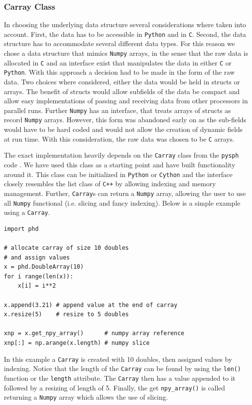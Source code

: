\subsubsection{Carray Class}
In choosing the underlying data structure several considerations where taken into account. First, the
data has to be accessible in \texttt{Python} and in \texttt{C}. Second, the data structure has to
accommodate several different data types. For this reason we chose a data structure that mimics
\texttt{Numpy} arrays, in the sense that the raw data is allocated in \texttt{C} and an interface exist that
manipulates the data in either \texttt{C} or \texttt{Python}. With this approach a decision had to be
made in the form of the raw data. Two choices where considered, either the data would
be held in structs or arrays. The benefit of structs would allow subfields of the data
be compact and allow easy implementations of passing and receiving data from other
processors in parallel runs. Further \texttt{Numpy} has an interface, that treats
arrays of structs as record \texttt{Numpy} arrays. However, this form was abandoned early on
as the sub-fields would have to be hard coded and would not allow the creation of
dynamic fields at run time. With this consideration, the raw data was chosen to be
\texttt{C} arrays. 

The exact implementation heavily depends on the \lstinline{Carray} class from the \texttt{pysph} code 
\citep{Ramachandran2016}. We have used this class as a starting point and have built functionality around
it. This class can be initialized in \texttt{Python} or \texttt{Cython} and the
interface closely resembles the list class of \texttt{C++} by allowing indexing and memory management. 
Further, \lstinline{Carray}s can return a \texttt{Numpy} array, allowing the user to use all \texttt{Numpy} 
functional (i.e. slicing and fancy indexing). Below is a simple example using a \lstinline{Carray}.
\begin{lstlisting}
import phd

# allocate carray of size 10 doubles
# and assign values
x = phd.DoubleArray(10)
for i range(len(x)):
	x[i] = i**2

x.append(3.21) # append value at the end of carray
x.resize(5)    # resize to 5 doubles

xnp = x.get_npy_array()      # numpy array reference
xnp[:] = np.arange(x.length) # numpy slice
\end{lstlisting}
In this example a \lstinline{Carray} is created with 10 doubles, then assigned values by indexing. Notice
that the length of the \lstinline{Carray} can be found by using the \lstinline{len()} function or the 
\lstinline{length} attribute. The \lstinline{Carray} then has a value appended to it followed by
a resizing of length of 5. Finally, the get \lstinline{npy_array()} is called returning a \texttt{Numpy}
array which allows the use of slicing. 

